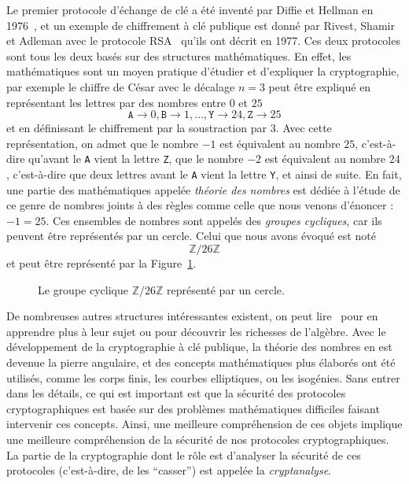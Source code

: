 Le premier protocole d'échange de clé a été inventé par Diffie et Hellman en
1976~\cite{DH76}, et un exemple de chiffrement à clé publique est donné par
Rivest, Shamir et Adleman avec le protocole RSA~\cite{RSA78} qu'ils ont décrit en
1977. Ces deux protocoles sont tous les deux basés sur des structures
mathématiques. En effet, les mathématiques sont un moyen pratique d'étudier et
d'expliquer la cryptographie, par exemple le chiffre de César avec le décalage
$n=3$
peut être expliqué en représentant les lettres par des nombres entre $0$ et $25$
\[
  \texttt{A}\to 0, \texttt{B} \to 1, \dots,\texttt{Y}\to24, \texttt{Z}\to25
\]
et en définissant le chiffrement par la soustraction par $3$. Avec cette
représentation, on admet que le nombre $-1$ est équivalent au nombre
$25$, c'est-à-dire qu'avant le \texttt{A} vient la lettre \texttt{Z}, que le
nombre $-2$ est équivalent au nombre $24$, c'est-à-dire que deux lettres avant
le \texttt{A} vient la lettre \texttt{Y}, et ainsi de suite. En fait, une partie
des mathématiques appelée \emph{théorie des nombres} est dédiée à l'étude de ce
genre de nombres joints à des règles comme celle que nous venons d'énoncer :
$-1=25$. Ces ensembles de nombres sont appelés des \emph{groupes cycliques}, car
ils peuvent être représentés par un cercle. Celui que nous avons évoqué est noté
\[
  \mathbb{Z}/26\mathbb{Z}
\]
et peut être représenté par la Figure~\ref{fig:cyclic-group}.
\begin{figure}
  \centering
  \caption{Le groupe cyclique $\mathbb{Z}/26\mathbb{Z}$ représenté par un
cercle.}
  \label{fig:cyclic-group}
\end{figure}
De nombreuses autres structures intéressantes existent, on peut
lire~\cite{Lang04, Perrin96} pour en apprendre plus à leur sujet ou pour
découvrir les richesses de l'algèbre. Avec le développement de la cryptographie
à clé publique, la théorie des nombres en est devenue la pierre angulaire, et
des concepts mathématiques plus élaborés ont été utilisés, comme les corps
finis, les courbes elliptiques, ou les isogénies. Sans entrer dans les détails,
ce qui est important est que la sécurité des protocoles cryptographiques est
basée sur des problèmes mathématiques difficiles faisant intervenir ces
concepts. Ainsi, une meilleure compréhension de ces objets implique une
meilleure compréhension de la sécurité de nos protocoles cryptographiques. La
partie de la cryptographie dont le rôle est d'analyser la sécurité de ces
protocoles (c'est-à-dire, de les ``casser'') est appelée la \emph{cryptanalyse}.

